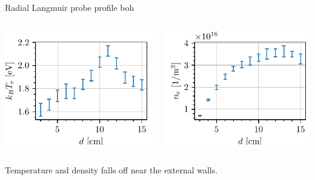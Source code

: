\documentclass[10pt]{beamer}
\begin{document}
\begin{frame}{Radial Langmuir probe profile boh}
    \begin{columns}
        \centering
        \includegraphics[scale=1]{../figures/temperatureeV_position_radial.pdf}

        \centering
        \includegraphics[scale=1]{../figures/density_position_radial.pdf}

    \end{columns}
    \vspace{0.5cm}
    Temperature and density falls off near the external walls.
\end{frame}
\end{document}
